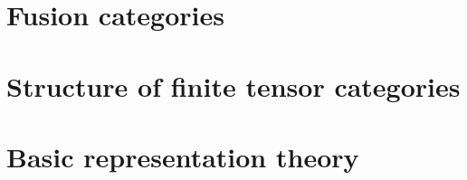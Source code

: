         \minitoc
        
        
        
        
    
    \chapter{Fusion categories}
        \begin{abstract}
            
        \end{abstract}
        
        \minitoc
        
        
        
        
        
        
    
    \begin{appendices}
        \chapter{Structure of finite tensor categories}
            \begin{abstract}
            
            \end{abstract}
            
            \minitoc
        
            
            
            
            
        \chapter{Basic representation theory}
            \begin{abstract}
            
            \end{abstract}
            
            \minitoc
            
            
            
            
        
    \end{appendices}
	
	\printbibliography

